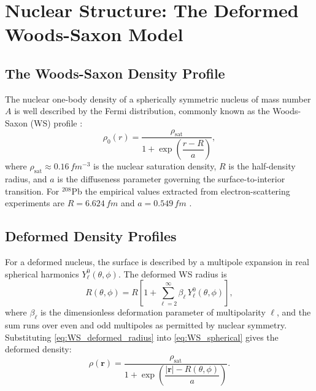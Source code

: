 \documentclass[12pt,a4paper,twoside]{report}
\begin{document}
\section{Nuclear Structure: The Deformed Woods-Saxon Model}
\label{sec:nuclear_structure}

\subsection{The Woods-Saxon Density Profile}
\label{subsec:WS}

The nuclear one-body density of a spherically symmetric nucleus of mass
number $A$ is well described by the Fermi distribution, commonly known
as the Woods-Saxon (WS) profile \cite{WoodsSaxon1954}:
\begin{equation}
  \rho_0(r) = \frac{\rho_\mathrm{sat}}{1 + \exp\!\left(\dfrac{r - R}{a}\right)},
  \label{eq:WS_spherical}
\end{equation}
where $\rho_\mathrm{sat} \approx 0.16\,\si{fm^{-3}}$ is the nuclear
saturation density, $R$ is the half-density radius, and $a$ is the
diffuseness parameter governing the surface-to-interior transition.
For $^{208}$Pb the empirical values extracted from electron-scattering
experiments are
$R = 6.624\,\si{fm}$ and $a = 0.549\,\si{fm}$
\cite{deVries1987}.

\subsection{Deformed Density Profiles}
\label{subsec:deformed_WS}

For a deformed nucleus, the surface is described by a multipole
expansion in real spherical harmonics $Y_\ell^0(\theta, \phi)$.  The
deformed WS radius is
\begin{equation}
  R(\theta, \phi) = R \left[
    1 + \sum_{\ell=2}^{\infty} \beta_\ell\, Y_\ell^0(\theta, \phi)
  \right],
  \label{eq:WS_deformed_radius}
\end{equation}
where $\beta_\ell$ is the dimensionless deformation parameter of
multipolarity $\ell$, and the sum runs over even and odd multipoles
as permitted by nuclear symmetry.  Substituting
\cref{eq:WS_deformed_radius} into \cref{eq:WS_spherical} gives the
deformed density:
\begin{equation}
  \rho(\bm{r}) = \frac{\rho_\mathrm{sat}}{1 + \exp\!\left(
    \dfrac{|\bm{r}| - R(\theta,\phi)}{a}
  \right)}.
  \label{eq:WS_deformed_full}
\end{equation}
\end{document}
